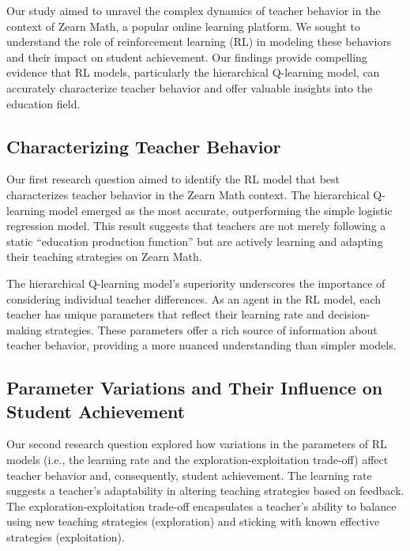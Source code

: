 \documentclass[
  number,
  preprint,
  3p,
  onecolumn]{elsarticle}
\begin{document}
Our study aimed to unravel the complex dynamics of teacher behavior in
the context of Zearn Math, a popular online learning platform. We sought
to understand the role of reinforcement learning (RL) in modeling these
behaviors and their impact on student achievement. Our findings provide
compelling evidence that RL models, particularly the hierarchical
Q-learning model, can accurately characterize teacher behavior and offer
valuable insights into the education field.

\hypertarget{characterizing-teacher-behavior}{%
\subsection{Characterizing Teacher
Behavior}\label{characterizing-teacher-behavior}}

Our first research question aimed to identify the RL model that best
characterizes teacher behavior in the Zearn Math context. The
hierarchical Q-learning model emerged as the most accurate,
outperforming the simple logistic regression model. This result suggests
that teachers are not merely following a static ``education production
function'' but are actively learning and adapting their teaching
strategies on Zearn Math.

The hierarchical Q-learning model's superiority underscores the
importance of considering individual teacher differences. As an agent in
the RL model, each teacher has unique parameters that reflect their
learning rate and decision-making strategies. These parameters offer a
rich source of information about teacher behavior, providing a more
nuanced understanding than simpler models.

\hypertarget{parameter-variations-and-their-influence-on-student-achievement}{%
\subsection{Parameter Variations and Their Influence on Student
Achievement}\label{parameter-variations-and-their-influence-on-student-achievement}}

Our second research question explored how variations in the parameters
of RL models (i.e., the learning rate and the exploration-exploitation
trade-off) affect teacher behavior and, consequently, student
achievement. The learning rate suggests a teacher's adaptability in
altering teaching strategies based on feedback. The
exploration-exploitation trade-off encapsulates a teacher's ability to
balance using new teaching strategies (exploration) and sticking with
known effective strategies (exploitation).
\end{document}

